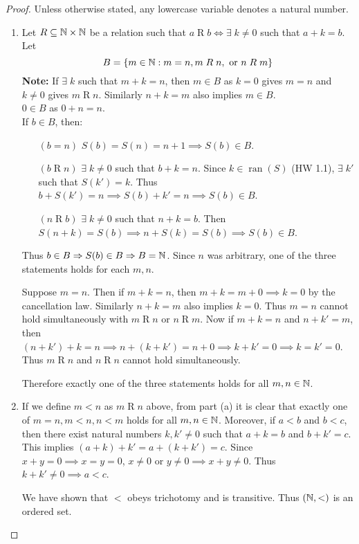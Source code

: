 \documentclass[12pt]{article}
\begin{document}
\begin{proof}
    Unless otherwise stated, any lowercase variable denotes a natural number.
    \begin{enumerate}[label=(\alph*)]
        \item Let $R \subseteq \mathbb{N} \times \mathbb{N}$ be a relation such that $a\mathrel{R}b \iff \exists\; k \neq 0$ such that $a + k = b$. Let \[
            B = \set{m \in \N : m = n, m\mathrel{R}n, \text{ or } n\mathrel{R}m}
        \]
        \textbf{Note:} If $\exists\; k$ such that $m + k = n$, then $m \in B$ as $k = 0$ gives $m = n$ and $k \neq 0$ gives $m \mathrel{R} n$. Similarly $n + k = m$ also implies $m \in B$. \\
        $0 \in B$ as $0 + n = n$. \\
        If $b \in B$, then:
        \begin{enumerate}
            \item[$(b = n)$] $S(b) = S(n) = n + 1 \implies S(b) \in B$.
            \item[$(b \mathrel{R} n)$] $\exists\; k \neq 0$ such that $b + k = n$. Since $k \in \operatorname{ran}(S)$ (HW 1.1), $\exists\; k'$ such that $S(k') = k$. Thus $b + S(k') = n \implies S(b) + k' = n \implies S(b) \in B$.
            \item[$(n \mathrel{R} b)$] $\exists\; k \neq 0$ such that $n + k = b$. Then $S(n + k) = S(b) \implies n + S(k) = S(b) \implies S(b) \in B$.
        \end{enumerate}
        Thus $b \in B \Rightarrow S(b) \in B \Rightarrow B = \mathbb{N}$.
        Since $n$ was arbitrary, one of the three statements holds for each $m, n$.

        Suppose $m = n$.
        Then if $m + k = n$, then $m + k = m + 0 \implies k = 0$ by the cancellation law.
        Similarly $n + k = m$ also implies $k = 0$.
        Thus $m = n$ cannot hold simultaneously with $m \mathrel{R} n$ or $n \mathrel{R} m$.
        Now if $m + k = n$ and $n + k' = m$, then $(n + k') + k = n \implies n + (k + k') = n + 0 \implies k + k' = 0 \implies k = k' = 0$.
        Thus $m \mathrel{R} n$ and $n \mathrel{R} n$ cannot hold simultaneously.

        Therefore exactly one of the three statements holds for all $m, n \in \mathbb{N}$.

        \item If we define $m < n$ as $m \mathrel{R} n$ above, from part (a) it is clear that exactly one of $m = n, m < n, n < m$ holds for all $m, n \in \mathbb{N}$.
        Moreover, if $a < b$ and $b < c$, then there exist natural numbers $k, k' \neq 0$ such that $a + k = b$ and $b + k' = c$.
        This implies $(a + k) + k' = a + (k + k') = c$.
        Since $x + y = 0 \implies x = y = 0$, $x \neq 0$ or $y \neq 0 \implies x + y \neq 0$.
        Thus $k + k' \neq 0 \implies a < c$.

        We have shown that $<$ obeys trichotomy and is transitive. Thus $(\mathbb{N}, <)$ is an ordered set. \qedhere
    \end{enumerate}
\end{proof}
\end{document}
